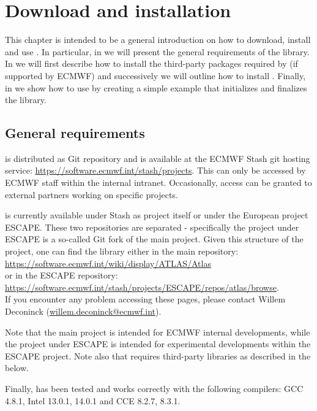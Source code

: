 \chapter{Download and installation}
\label{chap:installation}
This chapter is intended to be a general introduction 
on how to download, install and use \Atlas. In particular, 
in  we will present the general 
requirements of the library. In  we 
will first describe how to install the third-party packages 
required by \Atlas (if supported by ECMWF) and successively 
we will outline how to install \Atlas. Finally, in 
we show how to use \Atlas by creating a simple example 
that initializes and finalizes the library.


\section{General requirements}
\label{s:requirements}

\Atlas is distributed as Git repository and is available at the ECMWF Stash 
git hosting service: \url{https://software.ecmwf.int/stash/projects}.
This can only be accessed by ECMWF staff within the internal intranet.
Occasionally, access can be granted to external partners working 
on specific projects.

\Atlas is currently available under Stash as \Atlas project 
itself or under the European project ESCAPE. These two repositories 
are separated - specifically the \Atlas project under ESCAPE is 
a so-called Git fork of the main \Atlas project.
Given this structure of the \Atlas project, one can find the 
library either in the main repository:\\
\url{https://software.ecmwf.int/wiki/display/ATLAS/Atlas}\\
or in the ESCAPE repository:\\
\url{https://software.ecmwf.int/stash/projects/ESCAPE/repos/atlas/browse}.\\
If you encounter any problem accessing these pages, please contact 
Willem Deconinck (\url{willem.deconinck@ecmwf.int}).

Note that the main \Atlas project is intended for ECMWF internal 
developments, while the \Atlas project under ESCAPE is intended 
for experimental developments within the ESCAPE project.
Note also that \Atlas requires third-party libraries as described 
in the  below.

Finally, \Atlas has been tested and works correctly with the 
following compilers: GCC 4.8.1, Intel 13.0.1, 14.0.1 and CCE 
8.2.7, 8.3.1.


